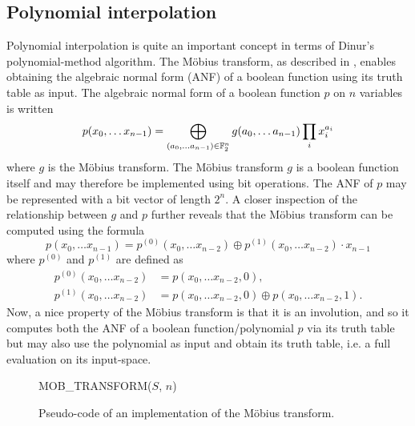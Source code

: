\subsection{Polynomial interpolation} \label{sec:prereq:poly_interp}
Polynomial interpolation is quite an important concept in terms of Dinur's polynomial-method algorithm. The Möbius transform, as described in \cite{joux2009algorithmic}, enables obtaining the algebraic normal form (ANF) of a boolean function using its truth table as input. The algebraic normal form of a boolean function $p$ on $n$ variables is written
$$
    p(x_0, \dots x_{n - 1}) = \bigoplus_{(a_0,\dots a_{n - 1}) \in \mathbb{F}_2^n} g(a_0, \dots a_{n - 1}) \prod_i x_i^{a_i}
$$
where $g$ is the Möbius transform. The Möbius transform $g$ is a boolean function itself and may therefore be implemented using bit operations. The ANF of $p$ may be represented with a bit vector of length $2^n$. A closer inspection of the relationship between $g$ and $p$ further reveals that the Möbius transform can be computed using the formula
$$
    p(x_0, \dots x_{n - 1}) = p^{(0)}(x_0, \dots x_{n - 2}) \oplus p^{(1)}(x_0, \dots x_{n - 2}) \cdot x_{n - 1}
$$
where $p^{(0)}$ and $p^{(1)}$ are defined as 
\begin{equation*}
    \begin{split}
        p^{(0)}(x_0, \dots x_{n - 2}) &= p(x_0, \dots x_{n - 2}, 0), \\
        p^{(1)}(x_0, \dots x_{n - 2}) &= p(x_0, \dots x_{n - 2}, 0) \oplus p(x_0, \dots x_{n - 2}, 1).
    \end{split}
\end{equation*}
Now, a nice property of the Möbius transform is that it is an involution, and so it computes both the ANF of a boolean function/polynomial $p$ via its truth table but may also use the polynomial as input and obtain its truth table, i.e. a full evaluation on its input-space.

\begin{figure}[t]
    \begin{alg}
        \caption{MOB\_TRANSFORM($S$, $n$)}
    \end{alg}
    \caption{Pseudo-code of an implementation of the Möbius transform.}
    \label{alg:mob}
\end{figure}


